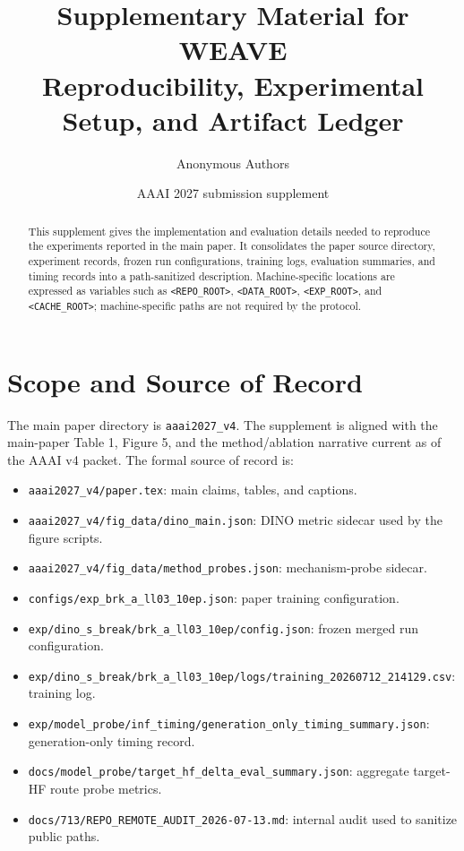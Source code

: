 \documentclass[10pt,twocolumn]{article}
\title{\vspace{-1.0em}\textbf{Supplementary Material for WEAVE}\\
\large Reproducibility, Experimental Setup, and Artifact Ledger}
\author{Anonymous Authors}
\date{AAAI 2027 submission supplement}
\begin{document}
\maketitle

\begin{abstract}
This supplement gives the implementation and evaluation details needed to reproduce the
experiments reported in the main paper. It consolidates the paper source directory,
experiment records, frozen run configurations, training logs, evaluation summaries,
and timing records into a path-sanitized description. Machine-specific locations are
expressed as variables such as \texttt{<REPO\_ROOT>}, \texttt{<DATA\_ROOT>},
\texttt{<EXP\_ROOT>}, and \texttt{<CACHE\_ROOT>}; machine-specific paths are not
required by the protocol.
\end{abstract}

\section{Scope and Source of Record}

The main paper directory is \texttt{aaai2027\_v4}. The supplement is aligned with the
main-paper Table 1, Figure 5, and the method/ablation narrative current as of the AAAI v4
packet. The formal source of record is:
\begin{itemize}[leftmargin=1.5em,itemsep=0.2em]
  \item \texttt{aaai2027\_v4/paper.tex}: main claims, tables, and captions.
  \item \texttt{aaai2027\_v4/fig\_data/dino\_main.json}: DINO metric sidecar used by the figure scripts.
  \item \texttt{aaai2027\_v4/fig\_data/method\_probes.json}: mechanism-probe sidecar.
  \item \texttt{configs/exp\_brk\_a\_ll03\_10ep.json}: paper training configuration.
  \item \texttt{exp/dino\_s\_break/brk\_a\_ll03\_10ep/config.json}: frozen merged run configuration.
  \item \texttt{exp/dino\_s\_break/brk\_a\_ll03\_10ep/logs/training\_20260712\_214129.csv}: training log.
  \item \texttt{exp/model\_probe/inf\_timing/generation\_only\_timing\_summary.json}: generation-only timing record.
  \item \texttt{docs/model\_probe/target\_hf\_delta\_eval\_summary.json}: aggregate target-HF route probe metrics.
  \item \texttt{docs/713/REPO\_REMOTE\_AUDIT\_2026-07-13.md}: internal audit used to sanitize public paths.
\end{itemize}
\end{document}
